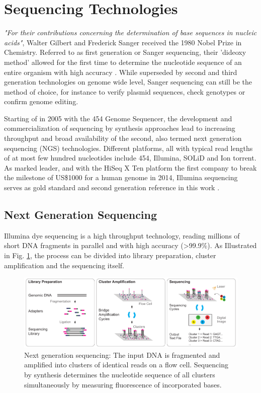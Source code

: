 \section{Sequencing Technologies}
\label{sec:intro:sequencing}

\textit{"For their contributions concerning the determination of base sequences in nucleic acids"}, Walter Gilbert and Frederick Sanger received the 1980 Nobel Prize in Chemistry.
Referred to as first generation or Sanger sequencing, their 'dideoxy method' allowed for the first time to determine the nucleotide sequence of an entire organism with high accuracy \cite{Sanger1977}.
While superseded by second and third generation technologies on genome wide level, Sanger sequencing can still be the method of choice, for instance to verify plasmid sequences, check genotypes or confirm genome editing.

Starting of in 2005 with the 454 Genome Sequencer, the development and commercialization of sequencing by synthesis approaches lead to increasing throughput and broad availability of the second, also termed next generation sequencing (NGS) technologies.
Different platforms, all with typical read lengths of at most few hundred nucleotides include 454, Illumina, SOLiD and Ion torrent.
As marked leader, and with the HiSeq X Ten platform the first company to break the milestone of US\$1000 for a human genome in 2014, Illumina sequencing serves as gold standard and second generation reference in this work \cite{Dijk2014}.

\subsection{Next Generation Sequencing}
\label{subsec:intro:ngs}

Illumina dye sequencing is a high throughput technology, reading millions of short DNA fragments in parallel and with high accuracy (>99.9\%).
As Illustrated in Fig. \ref{fig:intro:sbs}, the process can be divided into library preparation, cluster amplification and the sequencing itself.

\begin{figure}[h]
	\centering
	\includegraphics[width=1.0\textwidth]{figures/intro/sbs.pdf}
	\captionsetup{format=plain}
	\caption[Sequencing by synthesis]{Next generation sequencing: The input DNA is fragmented and amplified into clusters of identical reads on a flow cell. Sequencing by synthesis determines the nucleotide sequence of all clusters simultaneously by measuring fluorescence of incorporated bases.}
	\label{fig:intro:sbs}
\end{figure}

